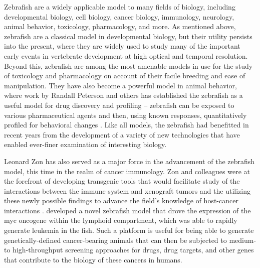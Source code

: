 Zebrafish are a widely applicable model to many fields of biology, including developmental biology, cell biology, cancer biology, immunology, neurology, animal behavior, toxicology, pharmacology, and more. As mentioned above, zebrafish are a classical model in developmental biology, but their utility persists into the present, where they are widely used to study many of the important early events in vertebrate development at high optical and temporal resolution. Beyond this, zebrafish are among the most amenable models in use for the study of toxicology and pharmacology on account of their facile breeding and ease of manipulation. They have also become a powerful model in animal behavior, where work by Randall Peterson and others has established the zebrafish as a useful model for drug discovery and profiling -- zebrafish can be exposed to various pharmaceutical agents and then, using known responses, quantitatively profiled for behavioral changes \citep{MacRae2003, Zon2005, Rihel2010, Kokel2010, Kokel2011, Peterson2012, MacRae2015, Bruni2016, Patton2021}. Like all models, the zebrafish had benefitted in recent years from the development of a variety of new technologies that have enabled ever\hyp{}finer examination of interesting biology.

Leonard Zon has also served as a major force in the advancement of the zebrafish model, this time in the realm of cancer immunology. Zon and colleagues were at the forefront of developing transgenic tools that would facilitate study of the interactions between the immune system and xenograft tumors and the utilizing these newly possible findings to advance the field's knowledge of host\hyp{}cancer interactions \citep{Amatruda2002, Trede2004, Cagan2019, McConnell2021}. \citet{Langenau2003} developed a novel zebrafish model that drove the expression of the myc oncogene within the lymphoid compartment, which was able to rapidly generate leukemia in the fish. Such a platform is useful for being able to generate genetically\hyp{}defined cancer\hyp{}bearing animals that can then be subjected to medium\hyp{} to high\hyp{}throughput screening approaches for drugs, drug targets, and other genes that contribute to the biology of these cancers in humans. 

